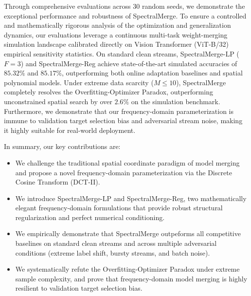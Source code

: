 Through comprehensive evaluations across 30 random seeds, we demonstrate the exceptional performance and robustness of SpectralMerge. To ensure a controlled and mathematically rigorous analysis of the optimization and generalization dynamics, our evaluations leverage a continuous multi-task weight-merging simulation landscape calibrated directly on Vision Transformer (ViT-B/32) empirical sensitivity statistics. On standard clean streams, SpectralMerge-LP ($F=3$) and SpectralMerge-Reg achieve state-of-the-art simulated accuracies of $85.32\%$ and $85.17\%$, outperforming both online adaptation baselines and spatial polynomial models. Under extreme data scarcity ($M \le 10$), SpectralMerge completely resolves the Overfitting-Optimizer Paradox, outperforming unconstrained spatial search by over $2.6\%$ on the simulation benchmark. Furthermore, we demonstrate that our frequency-domain parameterization is immune to validation target selection bias and adversarial stream noise, making it highly suitable for real-world deployment.

In summary, our key contributions are:
\begin{itemize}
    \item We challenge the traditional spatial coordinate paradigm of model merging and propose a novel frequency-domain parameterization via the Discrete Cosine Transform (DCT-II).
    \item We introduce SpectralMerge-LP and SpectralMerge-Reg, two mathematically elegant frequency-domain formulations that provide robust structural regularization and perfect numerical conditioning.
    \item We empirically demonstrate that SpectralMerge outpeforms all competitive baselines on standard clean streams and across multiple adversarial conditions (extreme label shift, bursty streams, and batch noise).
    \item We systematically refute the Overfitting-Optimizer Paradox under extreme sample complexity, and prove that frequency-domain model merging is highly resilient to validation target selection bias.
\end{itemize}
